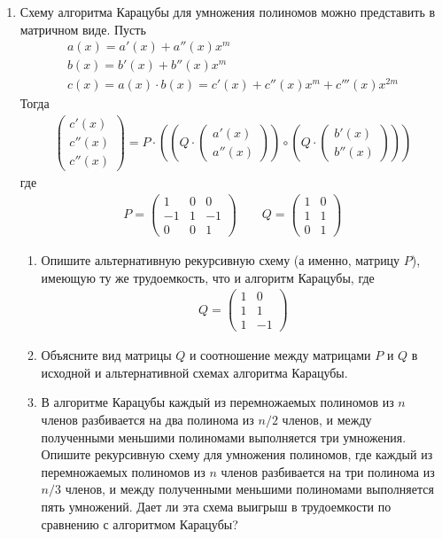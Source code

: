 \documentclass[11pt]{article}
\newenvironment{exercise}{\item}{}
\begin{document}
\begin{enumerate}
\begin{exercise}
Схему алгоритма Карацубы для умножения полиномов можно представить в матричном виде.
Пусть 
{\small
\begin{gather*} 
a(x) = a'(x) + a''(x) x^m\\
b(x) = b'(x) + b''(x) x^m\\ 
c(x) = a(x) \cdot b(x) = c'(x) + c''(x) x^m + c'''(x) x^{2m}
\end{gather*}}
%
Тогда
{\small
\begin{gather*} 
\begin{pmatrix}
c'(x) \\ c''(x) \\ c''(x)
\end{pmatrix}
= 
P \cdot
\left(\left(
Q \cdot
\begin{pmatrix}
a'(x) \\ a''(x)
\end{pmatrix}
\right)
\circ
\left(
Q \cdot
\begin{pmatrix}
b'(x) \\ b''(x)
\end{pmatrix}
\right)\right)
\end{gather*}}
где
{\small
\begin{gather*} 
P = 
\begin{pmatrix}
1 & 0 & 0 \\ -1 & 1 & -1 \\ 0 & 0 & 1
\end{pmatrix}
\qquad
Q =
\begin{pmatrix}
1 & 0 \\ 1 & 1 \\ 0 & 1
\end{pmatrix}
\end{gather*}}
%
\begin{enumerate}
%
\item Опишите альтернативную рекурсивную схему (а именно, матрицу $P$), 
имеющую ту же трудоемкость, что и алгоритм Карацубы, где 
{\small
\begin{gather*} 
Q =
\begin{pmatrix}
1 & 0 \\ 1 & 1 \\ 1 & -1
\end{pmatrix}
\end{gather*}}
%
\item Объясните вид матрицы $Q$ и соотношение между матрицами $P$ и $Q$ 
в исходной и альтернативной схемах алгоритма Карацубы.
%
\item В алгоритме Карацубы каждый из перемножаемых полиномов из $n$ членов 
разбивается на два полинома из $n/2$ членов, 
и между полученными меньшими полиномами выполняется три умножения.
Опишите рекурсивную схему для умножения полиномов,
где каждый из перемножаемых полиномов из $n$ членов 
разбивается на три полинома из $n/3$ членов, 
и между полученными меньшими полиномами выполняется пять умножений.
Дает ли эта схема выигрыш в трудоемкости по сравнению с алгоритмом Карацубы?
%
\end{enumerate}


\end{exercise}
\end{enumerate}
\end{document}
